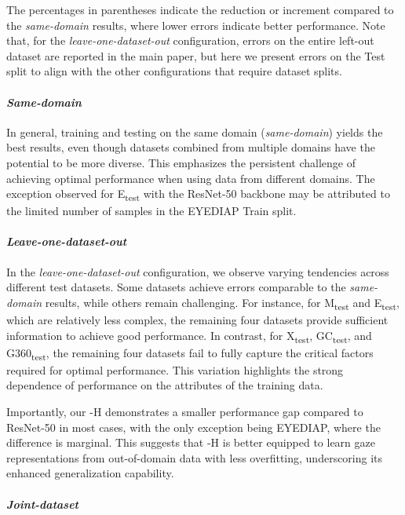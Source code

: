 The percentages in parentheses indicate the reduction or increment compared to the \textit{same-domain} results, where lower errors indicate better performance.
Note that, for the \textit{leave-one-dataset-out} configuration, errors on the entire left-out dataset are reported in the main paper, but here we present errors on the Test split to align with the other configurations that require dataset splits.



\paragraph{\textit{Same-domain}}
In general, training and testing on the same domain (\textit{same-domain}) yields the best results, even though datasets combined from multiple domains have the potential to be more diverse.
This emphasizes the persistent challenge of achieving optimal performance when using data from different domains.
The exception observed for E\textsubscript{test} with the ResNet-50 backbone may be attributed to the limited number of samples in the EYEDIAP Train split.

\paragraph{\textit{Leave-one-dataset-out}}
In the \textit{leave-one-dataset-out} configuration, we observe varying tendencies across different test datasets. 
Some datasets achieve errors comparable to the \textit{same-domain} results, while others remain challenging. 
For instance, for M\textsubscript{test} and E\textsubscript{test}, which are relatively less complex, the remaining four datasets provide sufficient information to achieve good performance.
In contrast, for X\textsubscript{test}, GC\textsubscript{test}, and G360\textsubscript{test}, the remaining four datasets fail to fully capture the critical factors required for optimal performance.
This variation highlights the strong dependence of performance on the attributes of the training data.

Importantly, our \methodname-H demonstrates a smaller performance gap compared to ResNet-50 in most cases, with the only exception being EYEDIAP, where the difference is marginal. 
This suggests that \methodname-H is better equipped to learn gaze representations from out-of-domain data with less overfitting, underscoring its enhanced generalization capability.


\paragraph{\textit{Joint-dataset}}


